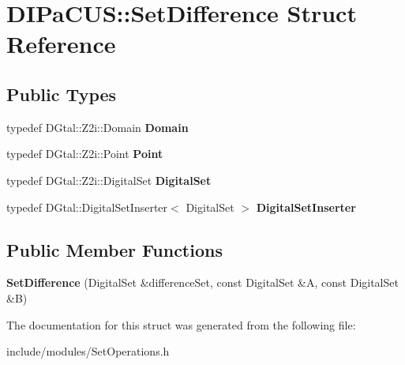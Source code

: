 \hypertarget{structDIPaCUS_1_1SetDifference}{}\section{D\+I\+Pa\+C\+US\+:\+:Set\+Difference Struct Reference}
\label{structDIPaCUS_1_1SetDifference}
\subsection*{Public Types}
\begin{DoxyCompactItemize}
\item 
\mbox{\label{structDIPaCUS_1_1SetDifference_abe54a04d46b7600648f2e35db6ee27f2}} 
typedef D\+Gtal\+::\+Z2i\+::\+Domain {\bfseries Domain}
\item 
\mbox{\label{structDIPaCUS_1_1SetDifference_a47ae06be56ceed52994b26b1d662454e}} 
typedef D\+Gtal\+::\+Z2i\+::\+Point {\bfseries Point}
\item 
\mbox{\label{structDIPaCUS_1_1SetDifference_aa837426fd076713abdb4b36b082a489a}} 
typedef D\+Gtal\+::\+Z2i\+::\+Digital\+Set {\bfseries Digital\+Set}
\item 
\mbox{\label{structDIPaCUS_1_1SetDifference_af0a864fce79d473694488263cd2e7059}} 
typedef D\+Gtal\+::\+Digital\+Set\+Inserter$<$ Digital\+Set $>$ {\bfseries Digital\+Set\+Inserter}
\end{DoxyCompactItemize}
\subsection*{Public Member Functions}
\begin{DoxyCompactItemize}
\item 
\mbox{\label{structDIPaCUS_1_1SetDifference_a358971c76ec0d548e0a2431246cb0d24}} 
{\bfseries Set\+Difference} (Digital\+Set \&difference\+Set, const Digital\+Set \&A, const Digital\+Set \&B)
\end{DoxyCompactItemize}


The documentation for this struct was generated from the following file\+:\begin{DoxyCompactItemize}
\item 
include/modules/Set\+Operations.\+h\end{DoxyCompactItemize}
